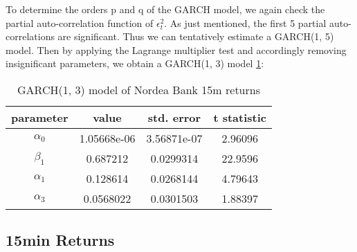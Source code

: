 \documentclass{book}
\begin{document}
To determine the orders p and q of the GARCH model, we again check
the partial auto-correlation function of $\epsilon_t^2$. As just
mentioned, the first 5 partial auto-correlations are significant. Thus
we can tentatively estimate a GARCH(1, 5) model. Then by applying the
Lagrange multiplier test and accordingly removing insignificant
parameters, we obtain a GARCH(1, 3) model
\ref{tab:nordea_15min_garch}:
\begin{table}[htb!]
  \centering
  \begin{tabular}{c|c|c|c}
    parameter & value & std. error & t statistic \\
    \hline
     $\alpha_0$ &   1.05668e-06 &   3.56871e-07 &    2.96096\\
     \hline
     $\beta_1$  &     0.687212  &   0.0299314   &    22.9596\\
     \hline
     $\alpha_1$ &      0.128614 &   0.0268144   &    4.79643\\
     \hline
     $\alpha_3$ &    0.0568022  &   0.0301503   &    1.88397
  \end{tabular}
  \caption{GARCH(1, 3) model of Nordea Bank 15m returns}
  \label{tab:nordea_15min_garch}
\end{table}

\subsection{15min Returns}




\end{document}
